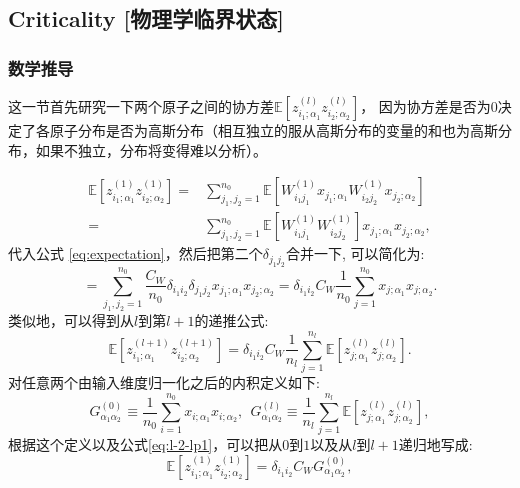 \subsection{Criticality [物理学临界状态]}

\subsubsection{数学推导}
这一节首先研究一下两个原子之间的协方差$\mathbb{E}[z_{i_1;\alpha_1}^{(l)}z_{i_2;\alpha_2}^{(l)}]$，
因为协方差是否为$0$决定了各原子分布是否为高斯分布（相互独立的服从高斯分布的变量的和也为高斯分布，如果不独立，分布将变得难以分析）。

\begin{equation*}
    \begin{aligned}
   \mathbb{E} [z_{i_1;\alpha_1}^{(1)}z_{i_2;\alpha_2}^{(1)}] =& \sum_{j_1,j_2=1}^{n_0} 
            \mathbb{E} [W_{i_1j_1}^{(1)}x_{j_1;\alpha_1}W_{i_2j_2}^{(1)}x_{j_2;\alpha_2}] \\
    =& \sum_{j_1,j_2=1}^{n_0} \mathbb{E} [W_{i_1j_1}^{(1)}W_{i_2j_2}^{(1)}]x_{j_1;\alpha_1}x_{j_2;\alpha_2},
    \end{aligned}
\end{equation*}
代入公式 \ref{eq:expectation}，然后把第二个$\delta_{j_1j_2}$合并一下, 可以简化为:
\begin{equation*}
             = \sum_{j_1,j_2=1}^{n_0} \frac{C_W}{n_0} 
             \delta_{i_1i_2}\delta_{j_1j_2}x_{j_1;\alpha_1}x_{j_2;\alpha_2}
             = \delta_{i_1i_2}C_W \frac{1}{n_0}\sum_{j=1}^{n_0}x_{j;\alpha_1}x_{j;\alpha_2}.
\end{equation*}
类似地，可以得到从$l$到第$l+1$的递推公式:
\begin{equation}
    \mathbb{E}[z_{i_1;\alpha_1}^{(l+1)} z_{i_2;\alpha_2}^{(l+1)}] = 
        \delta_{i_1i_2}C_W \frac{1}{n_l}\sum_{j=1}^{n_l}\mathbb{E} 
            [z_{j;\alpha_1}^{(l)}z_{j;\alpha_2}^{(l)}].
    \label{eq:l-2-lp1}
\end{equation}
对任意两个由输入维度归一化之后的内积定义如下:
\begin{equation*}
    G_{\alpha_1\alpha_2}^{(0)} \equiv \frac{1}{n_0} \sum_{i=1}^{n_0} x_{i;\alpha_1}x_{i;\alpha_2}, ~~
    G_{\alpha_1\alpha_2}^{(l)} \equiv \frac{1}{n_l} \sum_{j=1}^{n_l} 
        \mathbb{E}[z_{j;\alpha_1}^{(l)}z_{j;\alpha_2}^{(l)}],
\end{equation*}
根据这个定义以及公式\ref{eq:l-2-lp1}，可以把从$0$到$1$以及从$l$到$l+1$递归地写成:
\begin{equation}
    \mathbb{E}[z_{i_1;\alpha_1}^{(1)}z_{i_2;\alpha_2}^{(1)}] = \delta_{i_1i_2}C_W G_{\alpha_1\alpha_2}^{(0)},
\end{equation}
